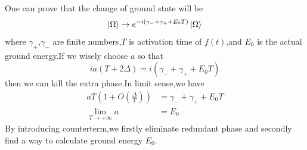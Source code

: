 \documentclass[a4paper]{article}
\begin{document}
\par One can prove that the change of ground state will be
$$\ket{\Omega}\rightarrow e^{-i(\gamma_-+\gamma_++E_0T)}\ket{\Omega}$$
where $\gamma_+$,$\gamma_-$ are finite numbers,$T$ is activation time of $f(t)$,and $E_0$ is the actual ground energy.If we wisely choose $a$  so that$$ia(T+2\Delta)=i(\gamma_-+\gamma_++E_0T)$$then we can kill the extra phase.In limit sense,we have
\begin{align*}
	aT(1+O(\frac{\Delta}{T}))&=\gamma_-+\gamma_++E_0T\\
	\lim_{T\rightarrow+\infty}a&=E_0
\end{align*}
By introducing counterterm,we firstly eliminate redundant phase and secondly find a way to calculate ground energy $E_0$.
\end{document}
